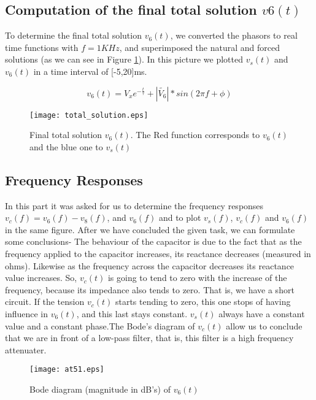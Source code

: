 \subsection{Computation of the final total solution $v6(t)$}

To determine the final total solution $v_6(t)$, we converted the phasors to real time functions with $f=1KHz$, and superimposed the natural and forced solutions (as we can see in Figure \ref{fig:tot}). In this picture we plotted $v_s(t)$ and $v_6(t)$ in a time interval of [-5,20]ms.

\begin{equation}
  v_6(t)= V_xe^{-\frac{t}{{\displaystyle \tau }}} + |\tilde{V_6}|*sin(2\pi f+ {\displaystyle \phi })
  \label{eq:vo_nat}
\end{equation}

\begin{figure}[H] \centering
\texttt{[image: total\_solution.eps]}
\caption{Final total solution $v_6(t)$. The Red function corresponds to $v_6(t)$ and the blue one to $v_s(t)$}
\label{fig:tot}
\end{figure}



\subsection{Frequency Responses}

In this part it was asked for us to determine the frequency responses $v_c(f)=v_6(f)-v_8(f)$, and $v_6(f)$ and to plot $v_s(f)$,  $v_c(f)$  and $v_6(f)$ in the same figure. After we have concluded the given task, we can formulate some conclusions- The behaviour of the capacitor is due to the fact that as the frequency applied to the capacitor increases, its reactance decreases (measured in ohms). Likewise as the frequency across the capacitor decreases its reactance value increases. So, $v_c(t)$ is going to tend to zero with the increase of the frequency, because its impedance also tends to zero. That is, we have a short circuit. If the tension $v_c(t)$ starts tending to zero, this one stops of having influence in $v_6(t)$, and this last stays constant. $v_s(t)$ always have a constant value and a constant phase.The Bode's diagram of $v_c(t)$ allow us to conclude that we are in front of a low-pass filter, that is, this filter is a high frequency attenuater.


\begin{figure}[h] \centering
\texttt{[image: at51.eps]}
\caption{Bode diagram (magnitude in dB's) of $v_6(t)$ }
\label{fig:51}
\end{figure}

